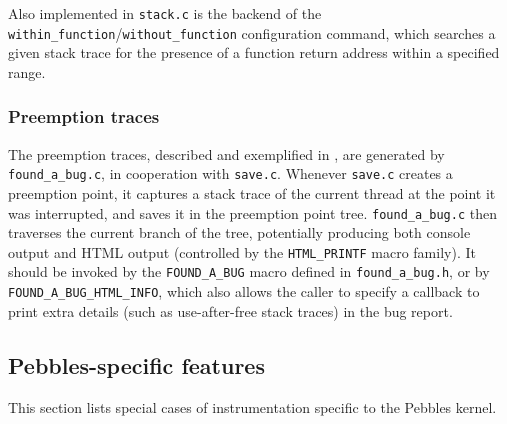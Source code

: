 Also implemented in {\tt stack.c} is the backend of the {\tt within\_function}/{\tt without\_function} configuration command,
which searches a given stack trace for the presence of a function return address within a specified range.

\subsubsection{Preemption traces}

The preemption traces, described and exemplified in \sect{\ref{sec:landslide-bugreport}}, are generated by {\tt found\_a\_\allowbreak{}bug.c},
in cooperation with {\tt save.c}.
Whenever {\tt save.c} creates a preemption point, it captures a stack trace of the current thread at the point it was interrupted, and saves it in the preemption point tree.
{\tt found\_a\_bug.c} then traverses the current branch of the tree,
potentially producing both console output and HTML output (controlled by the {\tt HTML\_PRINTF} macro family).
It should be invoked by the {\tt FOUND\_A\_BUG} macro defined in {\tt found\_a\_bug.h},
or by {\tt FOUND\_A\_BUG\_HTML\_INFO}, which also allows the caller to specify a callback to print extra details (such as use-after-free stack traces) in the bug report.


\subsection{Pebbles-specific features}
\label{sec:landslide-pebblesspecifics}

This section lists special cases of instrumentation specific to the Pebbles kernel.

